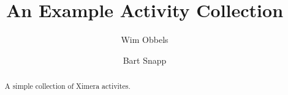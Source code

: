 \documentclass{xourse}
\begin{document}
\author{Wim Obbels \and Bart Snapp}
\title{An Example Activity Collection}
\begin{abstract}
    A simple collection of Ximera activites.
\end{abstract}
\maketitle

\end{document}
